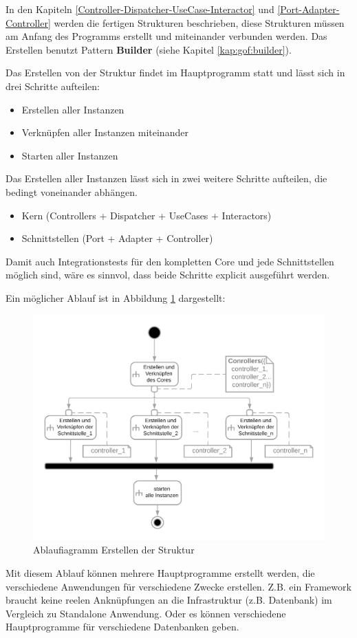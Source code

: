 In den Kapiteln \ref{Controller-Dispatcher-UseCase-Interactor} und \ref{Port-Adapter-Controller} 
werden die fertigen Strukturen beschrieben, diese Strukturen müssen am Anfang des Programms erstellt
und miteinander verbunden werden. Das Erstellen benutzt Pattern \textbf{Builder} (siehe Kapitel \ref{kap:gof:builder}).

Das Erstellen von der Struktur findet im Hauptprogramm statt und lässt sich in drei Schritte aufteilen:
\begin{itemize}
    \item Erstellen aller Instanzen
    \item Verknüpfen aller Instanzen miteinander
    \item Starten aller Instanzen
\end{itemize}

Das Erstellen aller Instanzen lässt sich in zwei weitere Schritte aufteilen, die bedingt voneinander abhängen.
\begin{itemize}
    \item Kern (Controllers + Dispatcher + UseCases + Interactors)
    \item Schnittstellen (Port + Adapter + Controller)
\end{itemize}

Damit auch Integrationstests für den kompletten Core und jede Schnittstellen möglich sind, wäre es sinnvol, dass beide Schritte
explicit ausgeführt werden.

Ein möglicher Ablauf ist in Abbildung \ref{fig:ADCreate} dargestellt:
\begin{figure}[H]
    \centering
    \includegraphics[width=12cm]{./images/Erstellen AD.png}
     \caption[Ablaufiagramm Erstellen der Struktur]{Ablaufiagramm Erstellen der Struktur}
     \label{fig:ADCreate}
\end{figure}

Mit diesem Ablauf können mehrere Hauptprogramme erstellt werden, die verschiedene Anwendungen für verschiedene Zwecke erstellen.
Z.B. ein Framework braucht keine reelen Anknüpfungen an die Infrastruktur (z.B. Datenbank) im Vergleich zu Standalone Anwendung.
Oder es können verschiedene Hauptprogramme für verschiedene Datenbanken geben.
